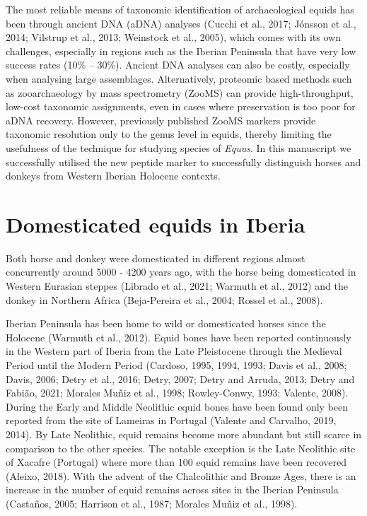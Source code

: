 \documentclass[preprint, 3p, authoryear]{elsarticle} %
\begin{document}
The most reliable means of taxonomic identification of archaeological equids has been through ancient DNA (aDNA) analyses (Cucchi et al., 2017; Jónsson et al., 2014; Vilstrup et al., 2013; Weinstock et al., 2005), which comes with its own challenges, especially in regions such as the Iberian Peninsula that have very low success rates (10\% -- 30\%). Ancient DNA analyses can also be costly, especially when analysing large assemblages. Alternatively, proteomic based methods such as zooarchaeology by mass spectrometry (ZooMS) can provide high-throughput, low-cost taxonomic assignments, even in cases where preservation is too poor for aDNA recovery. However, previously published ZooMS markers provide taxonomic resolution only to the genus level in equids, thereby limiting the usefulness of the technique for studying species of \emph{Equus}. In this manuscript we successfully utilised the new peptide marker to successfully distinguish horses and donkeys from Western Iberian Holocene contexts.

\hypertarget{domesticated-equids-in-iberia}{%
\section{Domesticated equids in Iberia}\label{domesticated-equids-in-iberia}}

Both horse and donkey were domesticated in different regions almost concurrently around 5000 - 4200 years ago, with the horse being domesticated in Western Eurasian steppes (Librado et al., 2021; Warmuth et al., 2012) and the donkey in Northern Africa (Beja-Pereira et al., 2004; Rossel et al., 2008).

Iberian Peninsula has been home to wild or domesticated horses since the Holocene (Warmuth et al., 2012). Equid bones have been reported continuously in the Western part of Iberia from the Late Pleistocene through the Medieval Period until the Modern Period (Cardoso, 1995, 1994, 1993; Davis et al., 2008; Davis, 2006; Detry et al., 2016; Detry, 2007; Detry and Arruda, 2013; Detry and Fabião, 2021; Morales Muñiz et al., 1998; Rowley-Conwy, 1993; Valente, 2008). During the Early and Middle Neolithic equid bones have been found only been reported from the site of Lameiras in Portugal (Valente and Carvalho, 2019, 2014). By Late Neolithic, equid remains become more abundant but still scarce in comparison to the other species. The notable exception is the Late Neolithic site of Xacafre (Portugal) where more than 100 equid remains have been recovered (Aleixo, 2018). With the advent of the Chalcolithic and Bronze Ages, there is an increase in the number of equid remains across sites in the Iberian Peninsula (Castaños, 2005; Harrison et al., 1987; Morales Muñiz et al., 1998).
\end{document}
